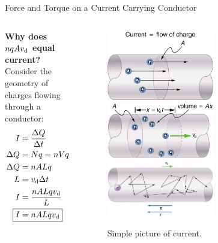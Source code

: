 \documentclass{beamer}
\begin{document}
\begin{frame}{Force and Torque on a Current Carrying Conductor}
\begin{columns}[T]
\begin{column}{0.4\textwidth}
\footnotesize
\textbf{\alert{Why does $nqAv_{\rm d}$ equal current?}} Consider the geometry of charges flowing through a conductor:
\begin{align}
I &= \frac{\Delta Q}{\Delta t} \\
\Delta Q &= N q = n V q \\
\Delta Q &= n A L q \\
L &= v_{\rm d} \Delta t \\
I &= \frac{n A L q v_{\rm d}}{L} \\
\Aboxed{I &= n A L q v_{\rm d}}
\end{align}
\end{column}
\begin{column}{0.6\textwidth}
\begin{figure}
\centering
\includegraphics[width=0.6\textwidth]{figures/current_1.png}
\includegraphics[width=0.6\textwidth]{figures/current_0.png}
\includegraphics[width=0.6\textwidth]{figures/current_2.png}
\caption{\label{fig:current} Simple picture of current.}
\end{figure}
\end{column}
\end{columns}
\end{frame}
\end{document}
